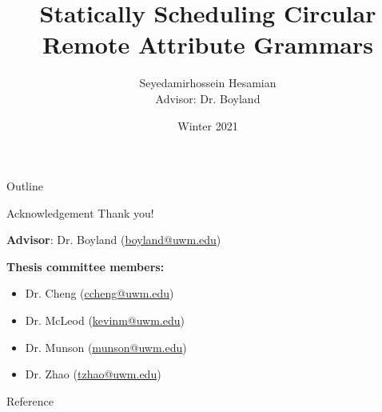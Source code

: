 \documentclass{beamer}
\title{Statically Scheduling Circular Remote Attribute Grammars}
\author[Seyedamirhossein Hesamian]{Seyedamirhossein Hesamian \texorpdfstring{\\{\small Advisor: Dr. Boyland}}{}}
\institute[UW-Milwaukee] %
{
  Department of Computer Science\\
  University of Wisconsin Milwaukee
}
\date{Winter 2021}
\newcommand{\emptyline}{\vspace{0.3cm}}
\begin{document}
\begin{frame}
  \titlepage
\end{frame}

\begin{frame}{Outline}
\tiny
  \tableofcontents
\end{frame}












\begin{frame}{Acknowledgement}{}
    {\huge \alert{Thank you!}}
    
    \emptyline
    
    \emptyline
    
    \textbf{Advisor}: Dr. Boyland (\url{boyland@uwm.edu})
    
    \emptyline
    
    \textbf{Thesis committee members:}
        \begin{itemize}
            \item Dr. Cheng (\url{ccheng@uwm.edu})
            \item Dr. McLeod (\url{kevinm@uwm.edu})
            \item Dr. Munson (\url{munson@uwm.edu})
            \item Dr. Zhao (\url{tzhao@uwm.edu})
        \end{itemize}
    
\end{frame}

\begin{frame}{Reference}{}
{\tiny \fontsize{1.5}{4}\selectfont

{}
}
\end{frame}
\end{document}
